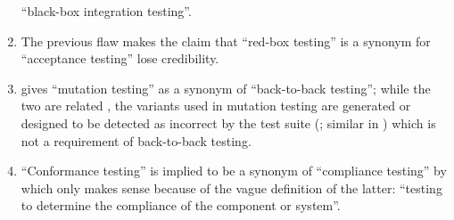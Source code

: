 \begin{enumerate}
          ``black-box integration testing''.
    \item %
          The previous flaw makes the claim that
          ``red-box testing'' is a synonym for ``acceptance testing''
          \citep[p.~18]{SneedAndGöschl2000} lose credibility.
    \item %
          \citet[p.~46]{Kam2008} gives ``mutation testing'' as a
          synonym of ``back-to-back testing''; while the two are related
          \citep[p.~30]{IEEE2010}, the variants used in mutation testing are
          generated or designed to be detected as incorrect by the test suite
          (\citealp[p.~5\=/15]{SWEBOK2024}; similar in
          \citealp[pp.~428\==429]{vanVliet2000}) which is not a requirement of
          back-to-back testing.
    \item %
          ``Conformance testing'' is implied to be a synonym of ``compliance
          testing'' by \citet[p.~43]{Kam2008} which only makes sense because
          of the vague definition of the latter: ``testing to
          determine the compliance of the component or system''.
\end{enumerate}